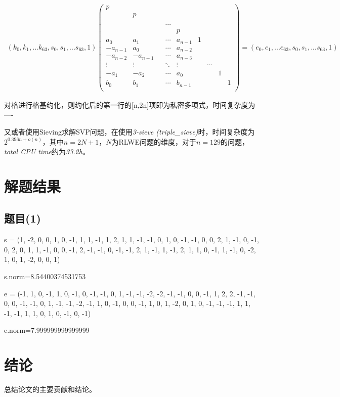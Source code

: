 \documentclass[12pt,a4paper]{article}
\numberwithin{equation}{section}
\begin{document}
\begin{align}
	(k_0,k_1,...k_{63},s_0,s_1,...s_{63},1)
	\left(
	\begin{smallmatrix}
			p\\
			&p\\
			&&\\
			&&&\cdots\\
			&&&&p\\
			a_0    &a_1    &   &\cdots &a_{n-1}            &1\\
			-a_{n-1}&a_0    &   &\cdots &a_{n-2}       &&\\
			-a_{n-2}&-a_{n-1}&   &\cdots &a_{n-3}  &&\\
			\vdots &\vdots &&\ddots &\vdots             &&\cdots\\
			-a_1    &-a_2    &   &\cdots &a_0 &&&1\\
			b_0    &b_1    &   &\cdots &b_{n-1}&&&&1\\
		\end{smallmatrix}
	\right)
	=
	(e_0,e_1,...e_{63},s_0,s_1,...s_{63},1)
\end{align}

对格进行格基约化，则约化后的第一行的[n,2n]项即为私密多项式，时间复杂度为----

又或者使用Sieving求解SVP问题，在使用\textit{3-sieve (triple\_sieve)}时，时间复杂度为$2^{0.396n+o(n)}$，其中$n=2N+1$，$N$为RLWE问题的维度，对于$n=129$的问题，\textit{total CPU time}约为\textit{33.2h}。

\section{解题结果}

\subsection{题目(1)}


s = (1, -2, 0, 0, 1, 0, -1, 1, 1, -1, 1, 2, 1, 1,
-1, -1, 0, 1, 0, -1, -1, 0, 0, 2, 1, -1, 0, -1, 0, 2, 0, 1,
1, -1, 0, 0, -1, 2, -1, -1, 0, -1, -1, 2, 1, -1, 1, -1, 2, 1, 1, 0,
-1, 1, -1, 0, -2, 1, 0, 1, -2, 0, 0, 1)

s.norm=8.54400374531753

\hspace*{\fill}

e = (-1, 1, 0, -1, 1, 0, -1, 0, -1, -1, 0, 1, -1, -1, -2, -2, -1, -1, 0, 0, -1, 1, 2, 2, -1,
-1, 0, 0, -1, -1, 0, 1, -1, -1, -2, -1, 1, 0, -1, 0, 0, -1, 1, 0, 1, -2, 0, 1, 0, -1, -1,
-1, 1, 1, -1, -1, 1, 1, 0, 1, 0, -1, 0, -1)

e.norm=7.999999999999999

\section{结论}

总结论文的主要贡献和结论。
\end{document}
